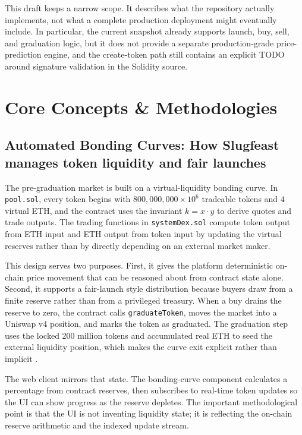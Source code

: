 \documentclass[10pt,letterpaper]{article}
\begin{document}
This draft keeps a narrow scope. It describes what the repository actually implements, not what a complete production deployment might eventually include. In particular, the current snapshot already supports launch, buy, sell, and graduation logic, but it does not provide a separate production-grade price-prediction engine, and the create-token path still contains an explicit TODO around signature validation in the Solidity source.

\section{Core Concepts \& Methodologies}

\subsection{Automated Bonding Curves: How Slugfeast manages token liquidity and fair launches}
The pre-graduation market is built on a virtual-liquidity bonding curve. In \texttt{pool.sol}, every token begins with \(800{,}000{,}000 \times 10^6\) tradeable tokens and \(4\) virtual ETH, and the contract uses the invariant \(k = x \cdot y\) to derive quotes and trade outputs. The trading functions in \texttt{systemDex.sol} compute token output from ETH input and ETH output from token input by updating the virtual reserves rather than by directly depending on an external market maker.

This design serves two purposes. First, it gives the platform deterministic on-chain price movement that can be reasoned about from contract state alone. Second, it supports a fair-launch style distribution because buyers draw from a finite reserve rather than from a privileged treasury. When a buy drains the reserve to zero, the contract calls \texttt{graduateToken}, moves the market into a Uniswap v4 position, and marks the token as graduated. The graduation step uses the locked 200 million tokens and accumulated real ETH to seed the external liquidity position, which makes the curve exit explicit rather than implicit \citep{UniswapV4Docs}.

The web client mirrors that state. The bonding-curve component calculates a percentage from contract reserves, then subscribes to real-time token updates so the UI can show progress as the reserve depletes. The important methodological point is that the UI is not inventing liquidity state; it is reflecting the on-chain reserve arithmetic and the indexed update stream.
\end{document}
